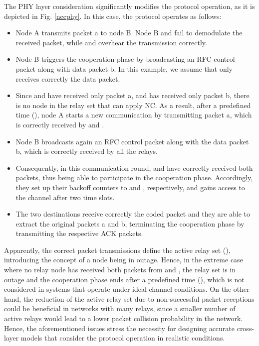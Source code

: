 \documentclass[12pt,draftcls, onecolumn]{IEEEtran}
\begin{document}
The PHY layer consideration significantly modifies the protocol operation, as it is depicted in Fig. \ref{nccphy}. In this case, the protocol operates as follows:
\begin{itemize}
  \item Node A transmits packet a to node B. Node B and  fail to demodulate the received packet, while  and  overhear the transmission correctly.
  \item Node B triggers the cooperation phase by broadcasting an RFC control packet along with data packet b. In this example, we assume that only  receives correctly the data packet.
  \item Since  and  have received only packet a, and  has received only packet b, there is no node in the relay set that can apply NC. As a result, after a predefined time (), node A starts a new communication by transmitting packet a, which is correctly received by  and .
  \item Node B broadcasts again an RFC control packet along with the data packet b, which is correctly received by all the relays.
  \item Consequently, in this communication round,  and  have correctly received both packets, thus being able to participate in the cooperation phase. Accordingly, they set up their backoff counters to  and , respectively, and  gains access to the channel after two time slots.
  \item The two destinations receive correctly the coded packet and they are able to extract the original packets a and b, terminating the cooperation phase by transmitting the respective ACK packets.
\end{itemize}

Apparently, the correct packet transmissions define the active relay set (), introducing the concept of a node being in outage. Hence, in the extreme case where no relay node has received both packets from  and , the relay set is in outage and the cooperation phase ends after a predefined time (), which is not considered in systems that operate under ideal channel conditions. On the other hand, the reduction of the active relay set due to non-successful packet receptions could be beneficial in networks with many relays, since a smaller number of active relays would lead to a lower packet collision probability in the network. Hence, the aforementioned issues stress the necessity for designing accurate cross-layer models that consider the protocol operation in realistic conditions.
\end{document}
